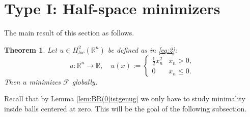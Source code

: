 \documentclass[twoside,11pt]{article}
\newtheorem{theorem}{Theorem}
\theoremstyle{definition}
\begin{document}
    
\section{Type I: Half-space minimizers}\label{sec:halfplane}



The main result of this section as follows.

\begin{theorem}\label{thm:Main}
    Let $u \in H^2_{loc}(\mathbb{R}^n)$ be defined as in \eqref{eq:2}:
    $$
     u : \mathbb{R}^n \rightarrow \mathbb{R}, \quad u(x):= \begin{cases}
    	\frac{1}{2}x_n^2 & x_n > 0,\\ 0 & x_n \leq 0.
    	\end{cases}
    	$$
     Then $u$ minimizes $\mathcal{F}$ globally. 
\end{theorem}


  
Recall that by Lemma \ref{lem:BR(0)istgenug} we only have to study minimality inside balls centered at zero. This will be the goal of the following subsection.
\end{document}
